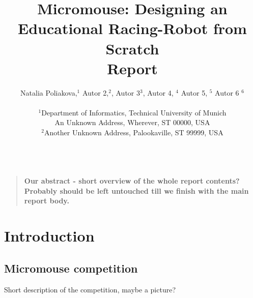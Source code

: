 \documentclass[12pt]{article}
\title{Micromouse: Designing an Educational Racing-Robot from Scratch \\Report}
\author
{Natalia Poliakova,$^{1}$ Autor 2,$^{2}$, Autor 3$^{3}$, Autor 4, $^{4}$ Autor 5, $^{5}$ Autor 6 $^{6}$\\
\\
\normalsize{$^{1}$Department of Informatics, Technical University of Munich}\\
\normalsize{An Unknown Address, Wherever, ST 00000, USA}\\
\normalsize{$^{2}$Another Unknown Address, Palookaville, ST 99999, USA}\\
\\
}
\date{}
\newenvironment{sciabstract}{%
\begin{quote} \bf}
{\end{quote}}
\begin{document}
 


\baselineskip24pt


\maketitle 




\begin{sciabstract}
    Our abstract - short overview of the whole report contents? Probably should be left untouched till we finish with the main report body.
\end{sciabstract}



\section{Introduction}

\subsection{Micromouse competition}
    Short description of the competition, maybe a picture? 
\end{document}

